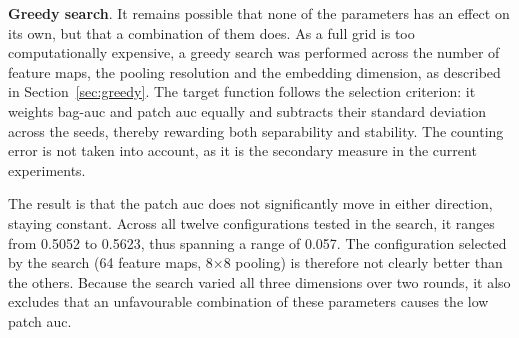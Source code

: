 \documentclass[12pt,parskip = half, DIV=classic,listof=totoc]{scrartcl}
\begin{document}
			\textbf{Greedy search}. It remains possible that none of the parameters has an effect on its own,
			but that a combination of them does. As a full grid is too computationally expensive, a greedy search was performed across the number of feature maps, the
			pooling resolution and the embedding dimension, as described in Section~\ref{sec:greedy}. The
			target function follows the selection criterion: it weights bag-\acs*{auc} and patch \ac{auc} equally 
			and subtracts their standard deviation across the seeds, thereby rewarding both separability and stability. The counting error is not
			taken into account, as it is the secondary measure in the current experiments.

			The result is that the patch \ac{auc} does not significantly move in either direction, staying constant. Across all twelve configurations
			tested in the search, it ranges from 0.5052 to 0.5623, thus spanning a range of 0.057. The configuration selected by the search 
			(64 feature maps, 8×8 pooling) is therefore not clearly better than the others. Because the search varied all three dimensions 
			over two rounds, it also excludes that an unfavourable combination of these parameters causes the low patch \ac{auc}. 
\end{document}
